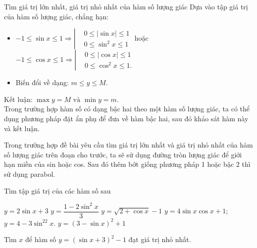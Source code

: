 \begin{dang}{Tìm giá trị lớn nhất, giá trị nhỏ nhất của hàm số lượng giác}
	Dựa vào tập giá trị của hàm số lượng giác, chẳng hạn:
	\begin{itemize}
		\item $ -1 \leq \sin x \leq 1 \Rightarrow \left|\begin{aligned}&0 \leq|\sin x| \leq 1\\&0 \leq \sin ^{2} x \leq 1 \end{aligned}\right.$ hoặc $ -1 \leq \cos x \leq 1 \Rightarrow \left|\begin{aligned}&0 \leq|\cos x| \leq 1\\&0 \leq \cos ^{2} x \leq 1. \end{aligned}\right.$
		\item Biến đổi về dạng: $ m \leq y \leq M $.
	\end{itemize}
	Kết luận: $ \max y=M \text { và } \min y=m $.\\
	Trong trường hợp hàm số có dạng bậc hai theo một hàm số lượng giác, ta có thể dụng phương pháp đặt ẩn phụ để đưa về hàm bậc hai, sau đó khảo sát hàm này và kết luận.\\
	\begin{note}
		Trong trường hợp đề bài yêu cầu tìm giá trị lớn nhất và giá trị nhỏ nhất của hàm số lượng giác trên đoạn cho trước, ta sẽ sử dụng đường tròn lượng giác để giới hạn miền của sin hoặc cos. Sau đó thêm bớt giống phương pháp 1 hoặc bậc 2 thì sử dụng parabol.
	\end{note}
\end{dang}
\viduminhhoa
\begin{vd}
	Tìm tập giá trị của các hàm số sau
	\begin{tasks}
		\task $y=2\sin x+3$
		\task $y=\dfrac{1-2{{\sin}^2}x}{3}$
		\task $y=\sqrt{2+\cos x}-1$
		\task $y=4\sin x\cos x+1$;
		\task $y=4-3\sin^22x$.
		\task $y={\left(3-\sin x \right)^2}+1$
	\end{tasks}
\end{vd}
\begin{vd}
	Tìm $x$ để hàm số $y={\left(\sin x+3 \right)^2}-1$ đạt giá trị nhỏ nhất.
\end{vd}


